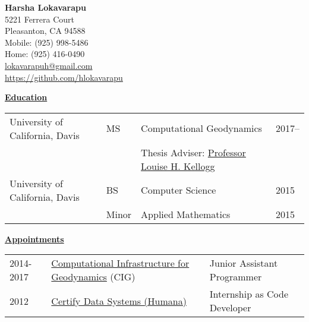 \documentclass[11pt]{ltxdoc}
\begin{document}
\begin{center}
  \textbf{Harsha Lokavarapu}                                            \\ [06pt]
  5221 Ferrera Court                                                    \\
  Pleasanton, CA 94588                                                  \\
  Mobile: (925) 998-5486                                                 \\
  Home:   (925) 416-0490                                                 \\
 \href{mailto:lokavarapuh@gmail.com}{lokavarapuh@gmail.com}             \\
  \href{https://github.com/hlokavarapu}{https://github.com/hlokavarapu} \\ [3pt]
\end{center}


\vskip 12pt

\begin{center}
	\textbf{\underline{Education}}
\end{center}

\vskip -06pt

\begin{tabular}{llll}
University of California, Davis              &MS       &Computational Geodynamics      & 2017-- \\
                                             &       &Thesis Adviser: \href{http://geology.ucdavis.edu/people/faculty/kellogg.php}{Professor Louise H. Kellogg}        &  \\
University of California, Davis              &BS      & Computer Science                         & 2015       \\
                                             &Minor   & Applied Mathematics                      & 2015
\end{tabular}

\vskip 18pt

\begin{center}
	\textbf{\underline{Appointments}}
\end{center}

\begin{tabular}{lll}
2014-2017     & \href{https://geodynamics.org/cig/}{Computational Infrastructure for Geodynamics} (CIG) & Junior Assistant Programmer \\
2012       & \href{https://www.humana.com}{Certify Data Systems (Humana)} & Internship as Code Developer
\end{tabular}
\end{document}
